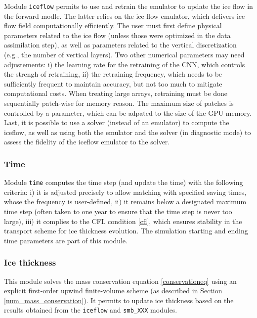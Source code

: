 \documentclass[gmd]{copernicus}
\begin{document}
Module \texttt{iceflow} permits to use and retrain the emulator to update the ice flow in the forward modle. The latter relies on the ice flow emulator, which delivers ice flow field computationally efficiently. The user must first define physical parameters related to the ice flow (unless those were optimized in the data assimilation step), as well as parameters related to the vertical discretization (e.g., the number of vertical layers). Two other numerical parameters may need adjustements: i) the learning rate for the retraining of the CNN, which controls the strengh of retraining, ii) the retraining frequency, which needs to be sufficiently frequent to maintain accuracy, but not too much to mitigate computational costs. When treating large arrays, retraining must be done sequentially patch-wise for memory reason. The maximum size of patches is controlled by a parameter, which can be adpated to the size of the GPU memory. Last, it is possible to use a solver (instead of an emulator) to compute the iceflow, as well as using both the emulator and the solver (in diagnostic mode) to assess the fidelity of the iceflow emulator to the solver.

\subsubsection{Time}
\label{module_time}

Module \texttt{time} computes the time step (and update the time) with the following criteria: i) it is adjusted precisely to allow matching with specified saving times, whose the frequency is user-defined, ii) it remains below a designated maximum time step (often taken to one year to ensure that the time step is never too large), iii) it complies to the CFL condition \eqref{cfl}, which ensures stability in the transport scheme for ice thickness evolution. The simulation starting and ending time parameters are part of this module.

\subsubsection{Ice thickness}
\label{module_thk}

This module solves the mass conservation equation \eqref{conservationeq} using an explicit first-order upwind finite-volume scheme (as described in Section \ref{num_mass_conservation}). It permits to update ice thickness based on the results obtained from the \texttt{iceflow} and \texttt{smb\_XXX} modules. 
\end{document}
